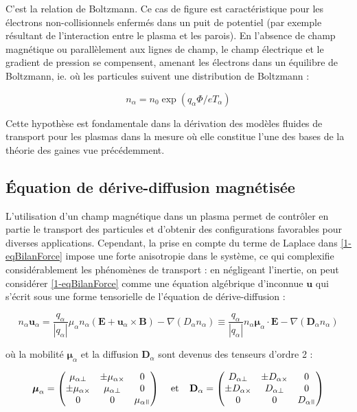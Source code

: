 \begin{refsection}
C'est la relation de Boltzmann. Ce cas de figure est caractéristique pour les
électrons non-collisionnels enfermés dans un puit de potentiel (par exemple résultant de
l'interaction entre le plasma et les parois). En l'absence de champ magnétique
ou parallèlement aux lignes de champ, le champ électrique et le gradient de
pression se compensent, amenant les électrons dans un équilibre de Boltzmann,
ie. où les particules suivent une distribution de Boltzmann :

\begin{equation}
\label{1-profilBoltzman}
n_\alpha=n_0\exp(q_\alpha \Phi/eT_\alpha)
\end{equation}

Cette hypothèse est fondamentale dans la dérivation des modèles fluides de
transport pour les plasmas dans la mesure où elle constitue l'une des bases de
la théorie des gaines vue précédemment. 

\subsection{Équation de dérive-diffusion magnétisée}
\label{1-deriveDiffMag}
L'utilisation d'un champ magnétique dans un plasma permet de contrôler en partie
le transport des particules et d'obtenir des configurations favorables pour
diverses applications. Cependant, la prise en compte du terme de Laplace dans
\eqref{1-eqBilanForce} impose une forte anisotropie dans le système, ce qui
complexifie considérablement les phénomènes de transport : en
négligeant l'inertie, on peut considérer \eqref{1-eqBilanForce} comme une
équation algébrique d'inconnue $\mathbf u$ qui s'écrit sous une forme
tensorielle de l'équation de dérive-diffusion :

\begin{equation}
\label{1-eqDriftDif}
n_\alpha\mathbf u_\alpha=\frac{q_\alpha}{|q_\alpha|}\mu_\alpha
n_\alpha\left(\mathbf E+\mathbf u_\alpha\times\mathbf
B\right)-\nabla\left(D_\alpha n_\alpha\right)\equiv
\frac{q_\alpha}{|q_\alpha|} n_\alpha\boldsymbol{\mu}_\alpha\cdot \mathbf
E-{\nabla\left(\mathbf{D}_\alpha n_\alpha\right)}
\end{equation}

où la mobilité $\boldsymbol{\mu}_\alpha$ et la diffusion $\mathbf{D}_\alpha$
sont devenus des tenseurs d'ordre 2 :

\begin{align}
\boldsymbol{\mu}_\alpha =
 \begin{pmatrix}
  \mu_{\alpha\perp} & \pm\mu_{\alpha\times} & 0 \\
  \pm\mu_{\alpha\times} & \mu_{\alpha\perp} & 0 \\
  0  & 0  & \mu_{\alpha\para} 
 \end{pmatrix}\;\;\;\;\text{et}\;\;\;\;
 \mathbf D_\alpha =
 \begin{pmatrix}
  D_{\alpha\perp} & \pm D_{\alpha\times} & 0 \\
 \pm D_{\alpha\times} & D_{\alpha\perp} & 0 \\
  0  & 0  & D_{\alpha\para} 
 \end{pmatrix}
\end{align}


\end{refsection}
